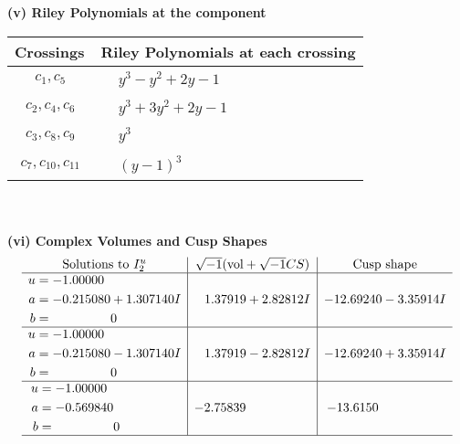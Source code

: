 \documentclass[1p]{elsarticle_modified}
\theoremstyle{definition}
\newcommand{\I}{\sqrt{-1}}
\begin{document}
\newpage\renewcommand{\arraystretch}{1}
\flushleft \textbf{(v) Riley Polynomials at the component}\newline \\
\begin{tabular}{m{50pt}|m{274pt}}
Crossings & \hspace{64pt}Riley Polynomials at each crossing \\
\hline $$\begin{aligned}c_{1},c_{5}\end{aligned}$$&$\begin{aligned}
&y^3- y^2+2 y-1
\end{aligned}$\\
\hline $$\begin{aligned}c_{2},c_{4},c_{6}\end{aligned}$$&$\begin{aligned}
&y^3+3 y^2+2 y-1
\end{aligned}$\\
\hline $$\begin{aligned}c_{3},c_{8},c_{9}\end{aligned}$$&$\begin{aligned}
&y^3
\end{aligned}$\\
\hline $$\begin{aligned}c_{7},c_{10},c_{11}\end{aligned}$$&$\begin{aligned}
&(y-1)^3
\end{aligned}$\\
\hline
\end{tabular}\\~\\
\newpage\flushleft \textbf{(vi) Complex Volumes and Cusp Shapes}
$$\begin{array}{c|c|c}  
\text{Solutions to }I^u_{2}& \I (\text{vol} + \sqrt{-1}CS) & \text{Cusp shape}\\
 \hline 
\begin{aligned}
u &= -1.00000\phantom{ +0.000000I} \\
a &= -0.215080 + 1.307140 I \\
b &= \phantom{-0.000000 } 0\end{aligned}
 & \phantom{-}1.37919 + 2.82812 I & -12.69240 - 3.35914 I \\ \hline\begin{aligned}
u &= -1.00000\phantom{ +0.000000I} \\
a &= -0.215080 - 1.307140 I \\
b &= \phantom{-0.000000 } 0\end{aligned}
 & \phantom{-}1.37919 - 2.82812 I & -12.69240 + 3.35914 I \\ \hline\begin{aligned}
u &= -1.00000\phantom{ +0.000000I} \\
a &= -0.569840\phantom{ +0.000000I} \\
b &= \phantom{-0.000000 } 0\end{aligned}
 & -2.75839\phantom{ +0.000000I} & -13.6150\phantom{ +0.000000I}\\
 \hline 
 \end{array}$$\newpage
\end{document}
